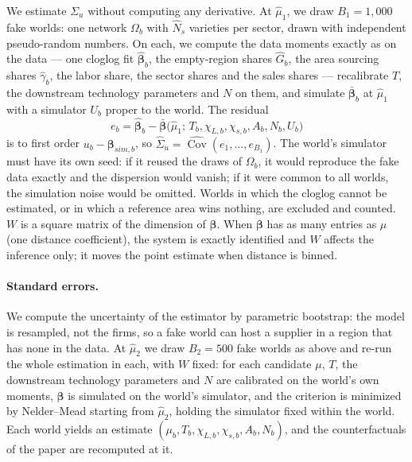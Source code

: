 We estimate $\Sigma_u$ without computing any derivative. At $\hat\mu_1$, we draw $B_1=1{,}000$ fake worlds: one network $\Omega_b$ with $\hat N_s$ varieties per sector, drawn with independent pseudo-random numbers. On each, we compute the data moments exactly as on the data --- one cloglog fit $\hat{\boldsymbol\beta}_b$, the empty-region shares $\hat G_b$, the area sourcing shares $\hat\gamma_b$, the labor share, the sector shares and the sales shares --- recalibrate $T$, the downstream technology parameters and $N$ on them, and simulate $\bar{\boldsymbol\beta}_b$ at $\hat\mu_1$ with a simulator $U_b$ proper to the world. The residual
\begin{equation}
e_b=\hat{\boldsymbol\beta}_b-\bar{\boldsymbol\beta}\big(\hat\mu_1;\,T_b,\chi_{L,b},\chi_{s,b},A_b,N_b,U_b\big)
\end{equation}
is to first order $u_b-\boldsymbol\beta_{sim,b}$, so $\hat\Sigma_u=\widehat{\operatorname{Cov}}(e_1,\dots,e_{B_1})$. The world's simulator must have its own seed: if it reused the draws of $\Omega_b$, it would reproduce the fake data exactly and the dispersion would vanish; if it were common to all worlds, the simulation noise would be omitted. Worlds in which the cloglog cannot be estimated, or in which a reference area wins nothing, are excluded and counted. $W$ is a square matrix of the dimension of $\boldsymbol\beta$. When $\boldsymbol\beta$ has as many entries as $\mu$ (one distance coefficient), the system is exactly identified and $W$ affects the inference only; it moves the point estimate when distance is binned.

\paragraph{Standard errors.} \label{app:model-standard_errors} 
We compute the uncertainty of the estimator by parametric bootstrap: the model is resampled, not the firms, so a fake world can host a supplier in a region that has none in the data. At $\hat\mu_2$ we draw $B_2=500$ fake worlds as above and re-run the whole estimation in each, with $W$ fixed: for each candidate $\mu$, $T$, the downstream technology parameters and $N$ are calibrated on the world's own moments, $\boldsymbol\beta$ is simulated on the world's simulator, and the criterion is minimized by Nelder--Mead starting from $\hat\mu_2$, holding the simulator fixed within the world. Each world yields an estimate $(\mu_b,T_b,\chi_{L,b},\chi_{s,b},A_b,N_b)$, and the counterfactuals of the paper are recomputed at it.

